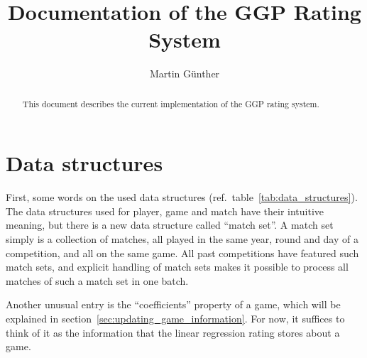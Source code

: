 \documentclass[a4paper,10pt]{article}
\title{Documentation of the GGP Rating System}
\author{Martin Günther}
\begin{document}
\maketitle

\begin{abstract}
This document describes the current implementation of the GGP rating system.
\end{abstract}

\section{Data structures}
First, some words on the used data structures (ref.\ table~\ref{tab:data_structures}).
The data structures used for player, game and match have their intuitive meaning, but there
is a new data structure called ``match set''. A match set simply is a collection of matches,
all played in the same year, round and day of a competition, and all on the same game.
All past competitions have featured such match sets, and explicit handling of match sets
makes it possible to process all matches of such a match set in one batch.

Another unusual entry is the  ``coefficients'' property of a game, which will be
explained in section~\ref{sec:updating_game_information}. For now, it suffices
to think of it as the information that the linear regression rating stores about
a game.
\end{document}

